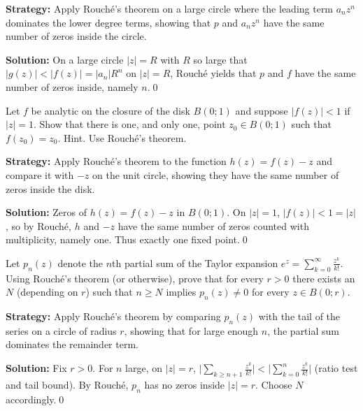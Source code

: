 \noindent\textbf{Strategy:} Apply Rouché's theorem on a large circle where the leading term \( a_n z^n \) dominates the lower degree terms, showing that \( p \) and \( a_n z^n \) have the same number of zeros inside the circle.

\bigskip\noindent\textbf{Solution:}
On a large circle $|z|=R$ with $R$ so large that $|g(z)|<|f(z)|=|a_n|R^n$ on $|z|=R$, Rouché yields that $p$ and $f$ have the same number of zeros inside, namely $n$.\qed


\begin{problembox}
\begin{problemstatement}
Let \( f \) be analytic on the closure of the disk \( B(0; 1) \) and suppose \( |f(z)| < 1 \) if \( |z| = 1 \). Show that there is one, and only one, point \( z_0 \in B(0; 1) \) such that \( f(z_0) = z_0 \). Hint. Use Rouché's theorem.
\end{problemstatement}
\end{problembox}

\noindent\textbf{Strategy:} Apply Rouché's theorem to the function \( h(z) = f(z) - z \) and compare it with \( -z \) on the unit circle, showing they have the same number of zeros inside the disk.

\bigskip\noindent\textbf{Solution:}
Zeros of $h(z)=f(z)-z$ in $B(0;1)$. On $|z|=1$, $|f(z)|<1=|z|$, so by Rouché, $h$ and $-z$ have the same number of zeros counted with multiplicity, namely one. Thus exactly one fixed point.\qed


\begin{problembox}
\begin{problemstatement}
Let \( p_n(z) \) denote the \( n \)th partial sum of the Taylor expansion \( e^z = \sum_{k=0}^{\infty} \frac{z^k}{k!} \). Using Rouché's theorem (or otherwise), prove that for every \( r > 0 \) there exists an \( N \) (depending on \( r \)) such that \( n \geq N \) implies \( p_n(z) \neq 0 \) for every \( z \in B(0; r) \).
\end{problemstatement}
\end{problembox}

\noindent\textbf{Strategy:} Apply Rouché's theorem by comparing \( p_n(z) \) with the tail of the series on a circle of radius \( r \), showing that for large enough \( n \), the partial sum dominates the remainder term.

\bigskip\noindent\textbf{Solution:}
Fix $r>0$. For $n$ large, on $|z|=r$, $\big|\sum_{k\ge n+1} \frac{z^k}{k!}\big|<\big|\sum_{k=0}^{n} \frac{z^k}{k!}\big|$ (ratio test and tail bound). By Rouché, $p_n$ has no zeros inside $|z|=r$. Choose $N$ accordingly.\qed


